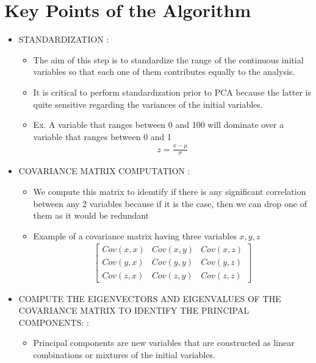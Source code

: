 \documentclass[a4paper, 11pt]{article}
\begin{document}
\section{Key Points of the Algorithm}
\begin{itemize}
    \item STANDARDIZATION :
    \begin{itemize}
        \item The aim of this step is to standardize the range of the continuous initial variables so that each one of them contributes equally to the analysis.
        \item It is critical to perform standardization prior to PCA  because the latter is quite sensitive regarding the variances of the initial variables.
        \item Ex. A variable that ranges between 0 and 100 will dominate over a variable that ranges between 0 and 1
        \begin{align}
            z = \frac{x-\mu}{\sigma}
        \end{align}
    \end{itemize} 
    \pagebreak
    \item COVARIANCE MATRIX COMPUTATION :
    \begin{itemize}
        \item We compute this matrix to idemtify if there is any significant correlation between any 2 variables because if it is the case, then we can drop one of them as it would be redundant
        \item Example of a covariance matrix having three variables $x,y,z$\\
        \begin{align}
            \begin{bmatrix}
                Cov(x,x) & Cov(x,y) & Cov(x,z)\\
                Cov(y,x) & Cov(y,y) & Cov(y,z) \\
                Cov(z,x) & Cov(z,y) & Cov(z,z)
                \end{bmatrix}  
        \end{align} 
    \end{itemize}
    \item  COMPUTE THE EIGENVECTORS AND EIGENVALUES OF THE COVARIANCE MATRIX TO IDENTIFY THE PRINCIPAL COMPONENTS:    :
    \begin{itemize}
        \item Principal components are new variables that are constructed as linear combinations or mixtures of the initial variables. 

\end{itemize}
\end{itemize}
\end{document}
